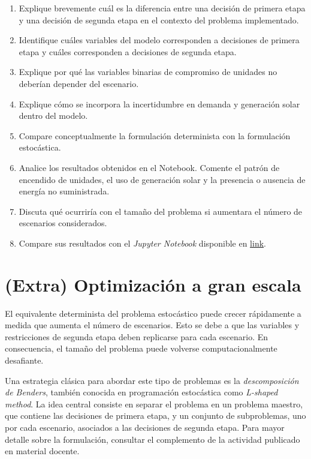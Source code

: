 \documentclass[
	spanish, %
	letterpaper, oneside
]{article}
\begin{document}
\begin{enumerate}

\item Explique brevemente cuál es la diferencia entre una decisión de primera etapa y una decisión de segunda etapa en el contexto del problema implementado.

\item Identifique cuáles variables del modelo corresponden a decisiones de primera etapa y cuáles corresponden a decisiones de segunda etapa.

\item Explique por qué las variables binarias de compromiso de unidades no deberían depender del escenario.

\item Explique cómo se incorpora la incertidumbre en demanda y generación solar dentro del modelo.

\item Compare conceptualmente la formulación determinista con la formulación estocástica.

\item Analice los resultados obtenidos en el Notebook. Comente el patrón de encendido de unidades, el uso de generación solar y la presencia o ausencia de energía no suministrada.

\item Discuta qué ocurriría con el tamaño del problema si aumentara el número de escenarios considerados.

\item Compare sus resultados con el \textit{Jupyter Notebook} disponible en \href{https://github.com/paoptlab/Apunte-Optimizacion-A2IC}{link}.

\end{enumerate}


\section{(Extra) Optimización a gran escala}

El equivalente determinista del problema estocástico puede crecer rápidamente a medida que aumenta el número de escenarios. Esto se debe a que las variables y restricciones de segunda etapa deben replicarse para cada escenario. En consecuencia, el tamaño del problema puede volverse computacionalmente desafiante.

Una estrategia clásica para abordar este tipo de problemas es la \textit{descomposición de Benders}, también conocida en programación estocástica como \textit{L-shaped method}. La idea central consiste en separar el problema en un problema maestro, que contiene las decisiones de primera etapa, y un conjunto de subproblemas, uno por cada escenario, asociados a las decisiones de segunda etapa. Para mayor detalle sobre la formulación,  consultar el complemento de la actividad publicado en material docente. 
\end{document}
